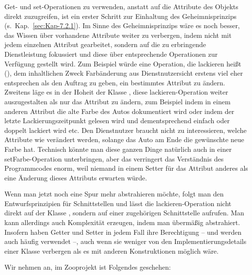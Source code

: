 Get- und set-Operationen zu verwenden, anstatt auf die Attribute des Objekts \mbox{direkt} zuzugreifen, ist ein erster Schritt zur Einhaltung des Geheimnisprinzips 
\linebreak %
(s.~Kap.~\ref{sec:Kap-7.2.1}). Im Sinne des Geheimnisprinzips wäre es noch besser, das Wissen über vorhandene Attribute weiter zu verbergen, indem nicht mit jedem einzelnen Attribut gearbeitet, sondern auf die zu erbringende Dienstleistung fokussiert und diese über entsprechende Operationen zur Verfügung gestellt wird. Zum Beispiel würde eine Operation, die lackieren heißt (), dem inhaltlichen Zweck Farbänderung aus Dienstnutzersicht erstens viel eher entsprechen als den Auftrag zu geben, ein bestimmtes Attribut zu ändern. Zweitens läge es in der Hoheit der Klasse , diese lackieren-Operation weiter auszugestalten als nur das Attribut  zu ändern, zum Beispiel indem in einem anderen Attribut die alte Farbe des Autos dokumentiert wird oder indem der letzte Lackierungszeitpunkt gelesen wird und dementsprechend einfach oder doppelt lackiert wird etc. Den Dienstnutzer braucht nicht zu interessieren, welche Attribute wie verändert werden, solange das Auto am Ende die gewünschte neue Farbe hat. Technisch könnte man diese ganzen Dinge natürlich auch in einer setFarbe-Operation unterbringen, aber das verringert das Verständnis des Programmcodes enorm, weil niemand in einem Setter für das Attribut  anderes als eine Änderung dieses Attributs erwarten würde. 

\vspace{2mm} %

Wenn man jetzt noch eine Spur mehr abstrahieren möchte, folgt man den Entwurfs\-prinzipien für Schnittstellen und lässt die lackieren-Operation nicht direkt auf der Klasse , sondern auf einer zugehörigen Schnittstelle aufrufen. Man kann aller\-dings auch Komplexität erzeugen, indem man übermäßig abstrahiert. Insofern haben Getter und Setter in jedem Fall ihre Berechtigung -- und werden auch häufig verwendet --, auch wenn sie weniger von den Implementierungsdetails einer Klasse verbergen als es mit anderen Konstruktionen möglich wäre.

\vspace{\baselineskip} %
\vspace{1mm} %

Wir nehmen an, im Zooprojekt ist Folgendes geschehen:

